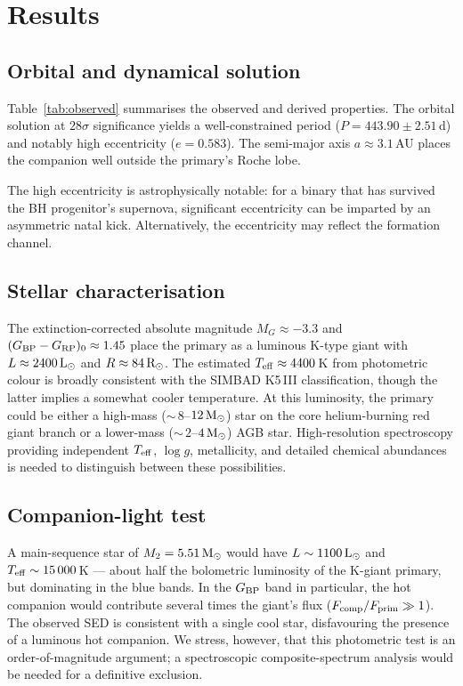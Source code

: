 \documentclass[usenatbib,fleqn]{mnras}
\newcommand{\Msun}{{\rm M}_\odot}
\newcommand{\Lsun}{{\rm L}_\odot}
\newcommand{\Rsun}{{\rm R}_\odot}
\begin{document}
\section{Results}
\label{sec:results}

\subsection{Orbital and dynamical solution}
\label{sec:results:orbit}

Table~\ref{tab:observed} summarises the observed and derived
properties.  The orbital solution at $28\sigma$ significance yields
a well-constrained period ($P = 443.90 \pm 2.51$\,d) and notably
high eccentricity ($e = 0.583$).  The semi-major axis
$a \approx 3.1$\,AU places the companion well outside the
primary's Roche lobe.

The high eccentricity is astrophysically notable: for a binary
that has survived the BH progenitor's supernova, significant
eccentricity can be imparted by an asymmetric natal kick.
Alternatively, the eccentricity may reflect the formation channel.

\subsection{Stellar characterisation}
\label{sec:results:stellar}

The extinction-corrected absolute magnitude
$M_G \approx -3.3$ and
$(G_{\rm BP} - G_{\rm RP})_0 \approx 1.45$ place the primary as
a luminous K-type giant with $L \approx 2400\,\Lsun$ and
$R \approx 84\,\Rsun$.  The estimated
$T_{\rm eff} \approx 4400$\,K from photometric colour is broadly
consistent with the SIMBAD K5\,III classification, though the
latter implies a somewhat cooler temperature.
At this luminosity, the primary could be either a
high-mass ($\sim$\,$8$--$12\,\Msun$) star on the core
helium-burning red giant branch or a lower-mass
($\sim$\,$2$--$4\,\Msun$) AGB star.
High-resolution spectroscopy providing independent
$T_{\rm eff}$, $\log g$, metallicity, and detailed chemical
abundances is needed to distinguish between these possibilities.

\subsection{Companion-light test}
\label{sec:results:companion}

A main-sequence star of $M_2 = 5.51\,\Msun$ would have
$L \sim 1100\,\Lsun$ and $T_{\rm eff} \sim 15\,000$\,K --- about
half the bolometric luminosity of the K-giant primary, but
dominating in the blue bands.  In the $G_{\rm BP}$ band in
particular, the hot companion would contribute several times
the giant's flux ($F_{\rm comp} / F_{\rm prim} \gg 1$).  The
observed SED is consistent with a single cool star, disfavouring
the presence of a luminous hot companion.
We stress, however, that this photometric test is an
order-of-magnitude argument; a spectroscopic composite-spectrum
analysis would be needed for a definitive exclusion.
\end{document}
